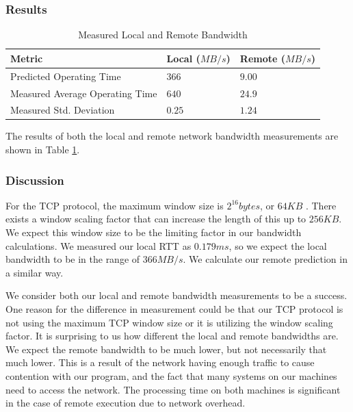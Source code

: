 \documentclass[sigconf]{acmart}
\begin{document}
\subsubsection{Results}
\begin{table}[h!]
\centering
\caption{Measured Local and Remote Bandwidth}
\label{LocalRemoteBandwidthMeasurements}
\begin{tabular}{|l|l|l|}
\hline
\textbf{Metric}						& \textbf{Local ($MB/s$)}	& \textbf{Remote ($MB/s$)}	\\ \hline
Predicted Operating Time			& $366$						& $9.00$					\\ \hline
Measured Average Operating Time		& $640$						& $24.9$					\\ \hline
Measured Std. Deviation				& $0.25$					& $1.24$					\\ \hline
\end{tabular}
\end{table}
The results of both the local and remote network bandwidth measurements are shown in Table \ref{LocalRemoteBandwidthMeasurements}.

\subsubsection{Discussion}
For the TCP protocol, the maximum window size is $2^{16} bytes$, or $64KB$ \cite{greer_2018}. There exists a window scaling factor that can increase the length of this up to $256KB$. We expect this window size to be the limiting factor in our bandwidth calculations. We measured our local RTT as $0.179ms$, so we expect the local bandwidth to be in the range of $366 MB/s$. We calculate our remote prediction in a similar way.

We consider both our local and remote bandwidth measurements to be a success. One reason for the difference in measurement could be that our TCP protocol is not using the maximum TCP window size or it is utilizing the window scaling factor. It is surprising to us how different the local and remote bandwidths are. We expect the remote bandwidth to be much lower, but not necessarily that much lower. This is a result of the network having enough traffic to cause contention with our program, and the fact that many systems on our machines need to access the network. The processing time on both machines is significant in the case of remote execution due to network overhead.
\end{document}
